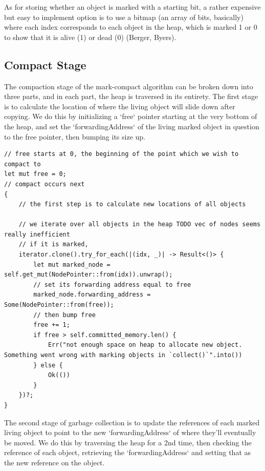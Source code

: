 \documentclass[index]{subfiles}
\begin{document}
As for storing whether an object is marked with a starting bit, a rather expensive but easy to implement option is to use a bitmap (an array of bits, basically) where each index corresponds to each object in the heap, which is marked 1 or 0 to show that it is alive (1) or dead (0) (Berger, Byers).

\subsection{Compact Stage}

The compaction stage of the mark-compact algorithm can be broken down into three parts, and in each part, the heap is traversed in its entirety. The first stage is to calculate the location of where the living object will slide down after copying. We do this by initializing a `free` pointer starting at the very bottom of the heap, and set the `forwardingAddress` of the living marked object in question to the free pointer, then bumping its size up.

\begin{verbatim}
// free starts at 0, the beginning of the point which we wish to compact to
let mut free = 0;
// compact occurs next
{
    // the first step is to calculate new locations of all objects

    // we iterate over all objects in the heap TODO vec of nodes seems really inefficient
    // if it is marked,
    iterator.clone().try_for_each(|(idx, _)| -> Result<()> {
        let mut marked_node = self.get_mut(NodePointer::from(idx)).unwrap();
        // set its forwarding address equal to free
        marked_node.forwarding_address = Some(NodePointer::from(free));
        // then bump free
        free += 1;
        if free > self.committed_memory.len() {
            Err("not enough space on heap to allocate new object. Something went wrong with marking objects in `collect()`".into())
        } else {
            Ok(())
        }
    })?;
}
\end{verbatim}

The second stage of garbage collection is to update the references of each marked living object to point to the new `forwardingAddress` of where they'll eventually be moved. We do this by traversing the heap for a 2nd time, then checking the reference of each object, retrieving the `forwardingAddress` and setting that as the new reference on the object.
\end{document}
